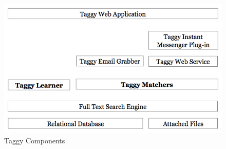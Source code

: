 \begin{figure}[bt]
	\centering
	\includegraphics[width=\textwidth]{Architecture.png}
    \caption{Taggy Components}
	\label{fig:architecture}
\end{figure}

